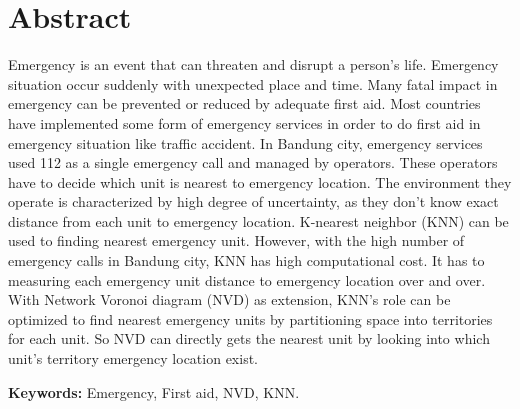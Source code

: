 \chapter*{Abstract}

Emergency is an event that can threaten and disrupt a person's life. Emergency situation occur suddenly with unexpected place and time. Many fatal impact in emergency can be prevented or reduced by adequate first aid. Most countries have implemented some form of emergency services in order to do first aid in emergency situation like traffic accident. In Bandung city, emergency services used 112 as a single emergency call and managed by operators. These operators have to decide which unit is nearest to emergency location. The environment they operate is characterized by high degree of uncertainty, as they don't know exact distance from each unit to emergency location. K-nearest neighbor (KNN) can be used to finding nearest emergency unit. However, with the high number of emergency calls in Bandung city, KNN has high computational cost. It has to measuring each emergency unit distance to emergency location over and over. With Network Voronoi diagram (NVD) as extension, KNN's role can be optimized to find nearest emergency units by partitioning space into territories for each unit. So NVD can directly gets the nearest unit by looking into which unit's territory emergency location exist.

\vspace{0.5 cm}
\begin{flushleft}
{\textbf{Keywords:} Emergency, First aid, NVD, KNN.}
\end{flushleft}